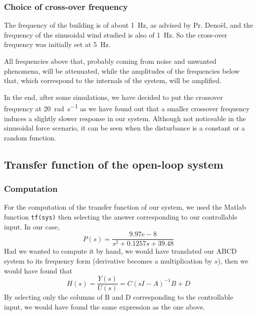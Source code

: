 \subsubsection{Choice of cross-over frequency}
The frequency of the building is of about \SI{1}{\hertz}, as advised by Pr. Denoël, and the frequency of the sinusoidal wind studied is also of \SI{1}{\hertz}. So the cross-over frequency was initially set at \SI{5}{\hertz}.\par
All frequencies above that, probably coming from noise and unwanted phenomena, will be attenuated, while the amplitudes of the frequencies below that, which correspond to the internals of the system, will be amplified.\par
In the end, after some simulations, we have decided to put the crossover frequency at \SI{20}{\radian\per\second} as we have found out that a smaller crossover frequency induces a slightly slower response in our system. Although not noticeable in the sinusoidal force scenario, it can be seen when the disturbance is a constant or a random function.

\subsection{Transfer function of the open-loop system}
\subsubsection{Computation}
For the computation of the transfer function of our system, we used the Matlab function \texttt{tf(sys)} then selecting the answer corresponding to our controllable input. In our case,
$$
P(s) = \dfrac{9.97e-8}{s^2 + 0.1257s + 39.48}
$$
Had we wanted to compute it by hand, we would have translated our ABCD system to its frequency form (derivative becomes a multiplication by $s$), then we would have found that
$$
H(s)=\frac{Y(s)}{U(s)}=C(s I-A)^{-1} B+D
$$
By selecting only the columns of B and D corresponding to the controllable input, we would have found the same expression as the one above.

